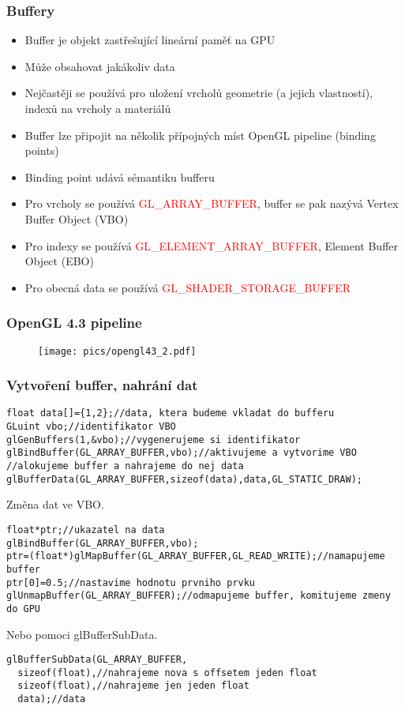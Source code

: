 
\begin{frame}
\frametitle{Buffery}
  \begin{itemize}
  \item Buffer je objekt zastřešující lineární paměť na GPU
  \item Může obsahovat jakákoliv data
  \item Nejčastěji se používá pro uložení vrcholů geometrie (a jejich vlastností), indexů na vrcholy a materiálů
  \item Buffer lze připojit na několik přípojných míst OpenGL pipeline (binding points)
  \item Binding point udává sémantiku bufferu
  \item Pro vrcholy se používá \textcolor{red}{GL\_ARRAY\_BUFFER}, buffer se pak nazývá Vertex Buffer Object (VBO)
  \item Pro indexy se používá \textcolor{red}{GL\_ELEMENT\_ARRAY\_BUFFER}, Element Buffer Object (EBO)
  \item Pro obecná data se používá \textcolor{red}{GL\_SHADER\_STORAGE\_BUFFER}
  \end{itemize}
\end{frame}

\begin{frame}
\frametitle{OpenGL 4.3 pipeline}
  \begin{figure}[h]
  \texttt{[image: pics/opengl43\_2.pdf]}
  \end{figure}
\end{frame}

\begin{frame}[fragile]
\frametitle{Vytvoření buffer, nahrání dat}
    {\scriptsize
    \begin{verbatim}
float data[]={1,2};//data, ktera budeme vkladat do bufferu
GLuint vbo;//identifikator VBO
glGenBuffers(1,&vbo);//vygenerujeme si identifikator
glBindBuffer(GL_ARRAY_BUFFER,vbo);//aktivujeme a vytvorime VBO
//alokujeme buffer a nahrajeme do nej data
glBufferData(GL_ARRAY_BUFFER,sizeof(data),data,GL_STATIC_DRAW);
    \end{verbatim}
    }
    Změna dat ve VBO.
    {\scriptsize
    \begin{verbatim}
float*ptr;//ukazatel na data
glBindBuffer(GL_ARRAY_BUFFER,vbo);
ptr=(float*)glMapBuffer(GL_ARRAY_BUFFER,GL_READ_WRITE);//namapujeme buffer
ptr[0]=0.5;//nastavime hodnotu prvniho prvku
glUnmapBuffer(GL_ARRAY_BUFFER);//odmapujeme buffer, komitujeme zmeny do GPU
    \end{verbatim}
    }
    Nebo pomoci {\color{blue} glBufferSubData}.
    {\scriptsize
    \begin{verbatim}
glBufferSubData(GL_ARRAY_BUFFER,
  sizeof(float),//nahrajeme nova s offsetem jeden float
  sizeof(float),//nahrajeme jen jeden float
  data);//data
    \end{verbatim}
    }
\end{frame}


